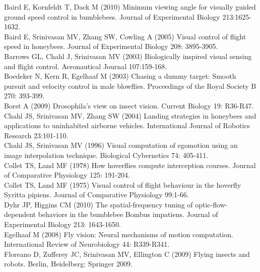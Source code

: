 \documentclass[12pt,letter]{article}
\begin{document}
\setlength\parindent{1cm}

\indent Baird E, Kornfeldt T, Dack M (2010) Minimum viewing angle for visually guided ground speed control in bumblebees. Journal of Experimental Biology  213:1625-1632.\\

Baird E, Srinivasan MV, Zhang SW, Cowling A (2005) Visual control of flight speed in honeybees. Journal of Experimental Biology  208: 3895-3905. \\

Barrows GL, Chahl J, Srinivasan MV (2003) Biologically inspired visual sensing and flight control. Aeronautical Journal  107:159-168. \\

Boedeker N, Kern R, Egelhaaf M (2003) Chasing a dummy target: Smooth pursuit and velocity control in male blowflies. Proceedings of the Royal Society B  270: 393-399.\\

Borst A (2009) Drosophila’s view on insect vision. Current Biology  19: R36-R47.\\

Chahl JS, Srinivasan MV, Zhang SW (2004) Landing strategies in honeybees and applications to uninhabited airborne vehicles. International Journal of Robotics Research  23:101-110. \\

Chahl JS, Srinivasan MV (1996) Visual computation of egomotion using an image interpolation technique. Biological Cybernetics  74: 405-411.\\

Collet TS, Land MF (1978) How hoverflies compute interception courses. Journal of Comparative Physiology  125: 191-204.\\

Collet TS, Land MF (1975) Visual control of flight behaviour in the hoverfly Syritta pipiens. Journal of Comparative Physiology  99:1-66.\\

Dyhr JP, Higgins CM (2010) The spatial-frequency tuning of optic-flow-dependent behaviors in the bumblebee Bombus impatiens. Journal of Experimental Biology  213: 1643-1650.\\

Egelhaaf M (2008) Fly vision: Neural mechanisms of motion computation. International Review of Neurobiology  44: R339-R341.\\

Floreano D, Zufferey JC, Srinivasan MV, Ellington C (2009) Flying insects and robots. Berlin, Heidelberg: Springer 2009.\\
\end{document}
